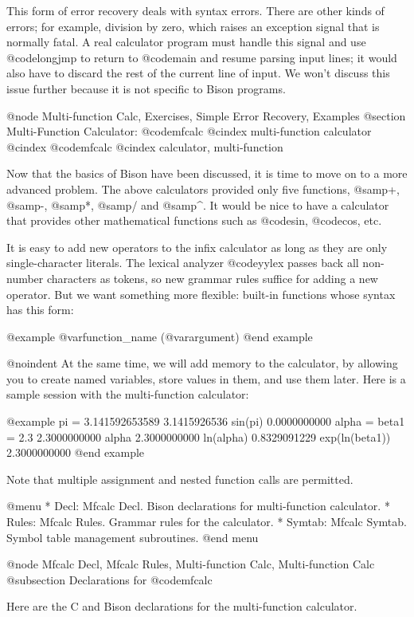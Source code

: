 {{{{{{{{{{This form of error recovery deals with syntax errors.  There are other
kinds of errors; for example, division by zero, which raises an exception
signal that is normally fatal.  A real calculator program must handle this
signal and use @code{longjmp} to return to @code{main} and resume parsing
input lines; it would also have to discard the rest of the current line of
input.  We won't discuss this issue further because it is not specific to
Bison programs.

@node Multi-function Calc, Exercises, Simple Error Recovery, Examples
@section Multi-Function Calculator: @code{mfcalc}
@cindex multi-function calculator
@cindex @code{mfcalc}
@cindex calculator, multi-function

Now that the basics of Bison have been discussed, it is time to move on to
a more advanced problem.  The above calculators provided only five
functions, @samp{+}, @samp{-}, @samp{*}, @samp{/} and @samp{^}.  It would
be nice to have a calculator that provides other mathematical functions such
as @code{sin}, @code{cos}, etc.

It is easy to add new operators to the infix calculator as long as they are
only single-character literals.  The lexical analyzer @code{yylex} passes
back all non-number characters as tokens, so new grammar rules suffice for
adding a new operator.  But we want something more flexible: built-in
functions whose syntax has this form:

@example
@var{function_name} (@var{argument})
@end example

@noindent
At the same time, we will add memory to the calculator, by allowing you
to create named variables, store values in them, and use them later.
Here is a sample session with the multi-function calculator:

@example
pi = 3.141592653589
3.1415926536
sin(pi)
0.0000000000
alpha = beta1 = 2.3
2.3000000000
alpha
2.3000000000
ln(alpha)
0.8329091229
exp(ln(beta1))
2.3000000000
%
@end example

Note that multiple assignment and nested function calls are permitted.

@menu
* Decl: Mfcalc Decl.     Bison declarations for multi-function calculator.
* Rules: Mfcalc Rules.   Grammar rules for the calculator.
* Symtab: Mfcalc Symtab. Symbol table management subroutines.
@end menu

@node Mfcalc Decl, Mfcalc Rules, Multi-function Calc, Multi-function Calc
@subsection Declarations for @code{mfcalc}

Here are the C and Bison declarations for the multi-function calculator.

}}}}}}}}}}
